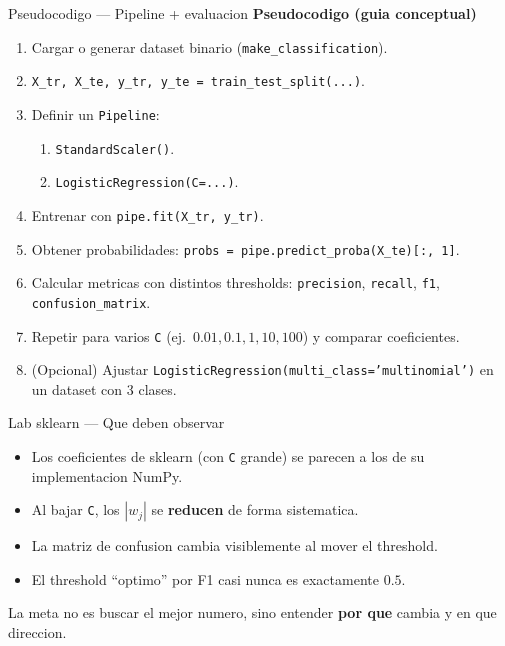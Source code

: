 \begin{frame}{Pseudocodigo — Pipeline + evaluacion}
\footnotesize
\textbf{Pseudocodigo (guia conceptual)}
\begin{enumerate}\footnotesize
  \item Cargar o generar dataset binario (\texttt{make\_classification}).
  \item \texttt{X\_tr, X\_te, y\_tr, y\_te = train\_test\_split(...)}.
  \item Definir un \texttt{Pipeline}:
  \begin{enumerate}\scriptsize
    \item \texttt{StandardScaler()}.
    \item \texttt{LogisticRegression(C=...)}.
  \end{enumerate}
  \item Entrenar con \texttt{pipe.fit(X\_tr, y\_tr)}.
  \item Obtener probabilidades: \texttt{probs = pipe.predict\_proba(X\_te)[:, 1]}.
  \item Calcular metricas con distintos thresholds: \texttt{precision}, \texttt{recall}, \texttt{f1}, \texttt{confusion\_matrix}.
  \item Repetir para varios \texttt{C} (ej.\ $0.01, 0.1, 1, 10, 100$) y comparar coeficientes.
  \item (Opcional) Ajustar \texttt{LogisticRegression(multi\_class='multinomial')} en un dataset con 3 clases.
\end{enumerate}
\end{frame}

\begin{frame}{Lab sklearn — Que deben observar}
\begin{itemize}\small
  \item Los coeficientes de sklearn (con \texttt{C} grande) se parecen a los de su implementacion NumPy.
  \item Al bajar \texttt{C}, los $|w_j|$ se \textbf{reducen} de forma sistematica.
  \item La matriz de confusion cambia visiblemente al mover el threshold.
  \item El threshold ``optimo'' por F1 casi nunca es exactamente $0.5$.
\end{itemize}

\vspace{0.3em}
{\footnotesize La meta no es buscar el mejor numero, sino entender \textbf{por que} cambia y en que direccion.}
\end{frame}

